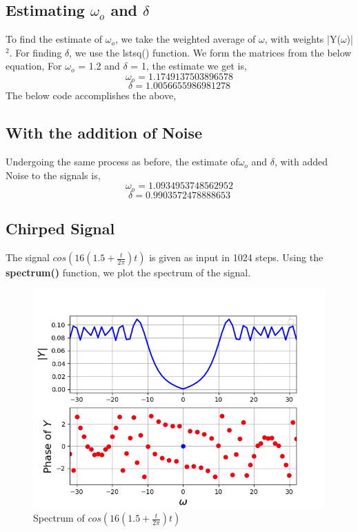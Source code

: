 \documentclass[12pt, a4paper]{report}
\begin{document}
\subsection{Estimating $\omega_o$ and $\delta$}
To find the estimate of $\omega_o$, we take the weighted average of $\omega$, with weights |Y($\omega$)|$^2$. For finding $\delta$, we use the lstsq() function. We form the matrices from the below equation,
For $\omega_o$ = 1.2 and $\delta$ = 1, the estimate we get is,
\begin{equation}
\omega_o = 1.1749137503896578
\end{equation}
\begin{equation}
    \delta = 1.0056655986981278
\end{equation}
The below code accomplishes the  above,
\noindent

\subsection{With the addition of Noise }
Undergoing the same process as before, the estimate of$\omega_o$ and $\delta$, with added Noise to the signals is,
\noindent
\begin{equation}
\omega_o = 1.0934953748562952
\end{equation}
\begin{equation}
    \delta = 0.9903572478888653
\end{equation}

\subsection{Chirped Signal}
The signal $cos(16(1.5+\frac{t}{2\pi})t)$ is given as input in 1024 steps. Using the \textbf{spectrum()} function, we plot the spectrum of the signal.
\noindent
\begin{figure}[h!]
    \centering
    \includegraphics[scale=0.7]{fig4.png} 
    \caption{Spectrum of $cos(16(1.5+\frac{t}{2\pi})t)$}
    \label{fig:my_label}
\end{figure}
\end{document}

